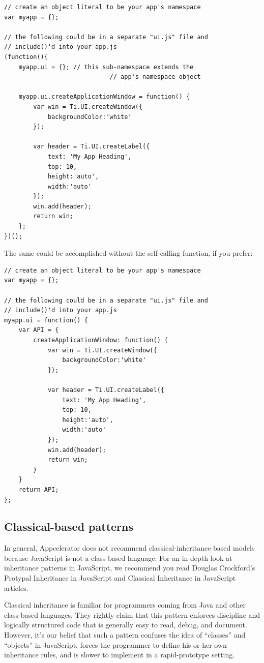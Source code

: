 \documentclass[11pt]{book}
\begin{document}
\begin{lstlisting}[frame=single]
// create an object literal to be your app's namespace
var myapp = {};

// the following could be in a separate "ui.js" file and
// include()'d into your app.js
(function(){
    myapp.ui = {}; // this sub-namespace extends the
                             // app's namespace object

    myapp.ui.createApplicationWindow = function() {
        var win = Ti.UI.createWindow({
            backgroundColor:'white'
        });

        var header = Ti.UI.createLabel({
            text: 'My App Heading',
            top: 10,
            height:'auto',
            width:'auto'
        });
        win.add(header);
        return win;
    };
})();
\end{lstlisting}

The same could be accomplished without the self-calling function, if you prefer:
\begin{lstlisting}[frame=single]
// create an object literal to be your app's namespace
var myapp = {};

// the following could be in a separate "ui.js" file and
// include()'d into your app.js
myapp.ui = function() {
    var API = {
        createApplicationWindow: function() {
            var win = Ti.UI.createWindow({
                backgroundColor:'white'
            });

            var header = Ti.UI.createLabel({
                text: 'My App Heading',
                top: 10,
                height:'auto',
                width:'auto'
            });
            win.add(header);
            return win;
        }
    }
    return API;
};
\end{lstlisting}

\subsection{Classical-based patterns}
In general, Appcelerator does not recommend classical-inheritance based models because JavaScript is not a class-based language. For an in-depth look at inheritance patterns in JavaScript, we recommend you read Douglas Crockford's Protypal Inheritance in JavaScript and Classical Inheritance in JavaScript articles.


Classical inheritance is familiar for programmers coming from Java and other class-based languages. They rightly claim that this pattern enforces discipline and logically structured code that is generally easy to read, debug, and document. However, it's our belief that such a pattern confuses the idea of ``classes'' and ``objects'' in JavaScript, forces the programmer to define his or her own inheritance rules, and is slower to implement in a rapid-prototype setting.
\end{document}
